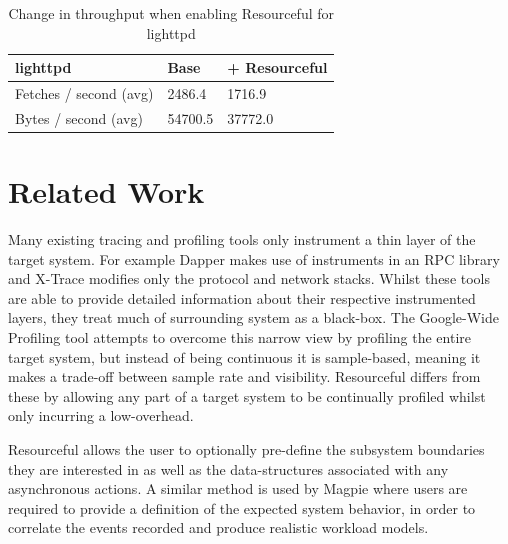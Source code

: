 \documentclass[letterpaper,twocolumn,10pt]{article}
\newcommand{\pname}{Resourceful}
\begin{document}
\begin{table}[ht!]
	\centering 
    \begin{tabular}{|l|l|l|}
    \hline
    \textbf{lighttpd}         & Base & + \pname \\ \hline
    Fetches / second (avg) & 2486.4 & 1716.9 \\ \hline
    Bytes / second (avg) & 54700.5 & 37772.0 \\ \hline
    \end{tabular}
    \caption{Change in throughput when enabling \pname{ } for lighttpd}
    \label{tbl:throughput} 
\end{table}

\section{Related Work} 




Many existing tracing and profiling tools only instrument a thin layer of the
target system. For example Dapper \cite{dapper} makes use of instruments in an
RPC library and X-Trace \cite{xtrace} modifies only the protocol and network
stacks. Whilst these tools are able to provide detailed information about their
respective instrumented layers, they treat much of surrounding system as a
black-box. The Google-Wide Profiling tool \cite{gwp} attempts to overcome this 
narrow view by profiling the entire target system, but instead of being continuous 
it is sample-based, meaning it makes a trade-off between sample rate and visibility. 
\pname{ } differs from these by allowing any part of a target system
to be continually profiled whilst only incurring a low-overhead.  

\pname{} allows the user to optionally pre-define the subsystem boundaries they are
interested in as well as the data-structures associated with any asynchronous
actions. A similar method is used by Magpie \cite{magpieosdi} where users are
required to provide a definition of the expected system behavior, in order to
correlate the events recorded and produce realistic workload models.
\end{document}
